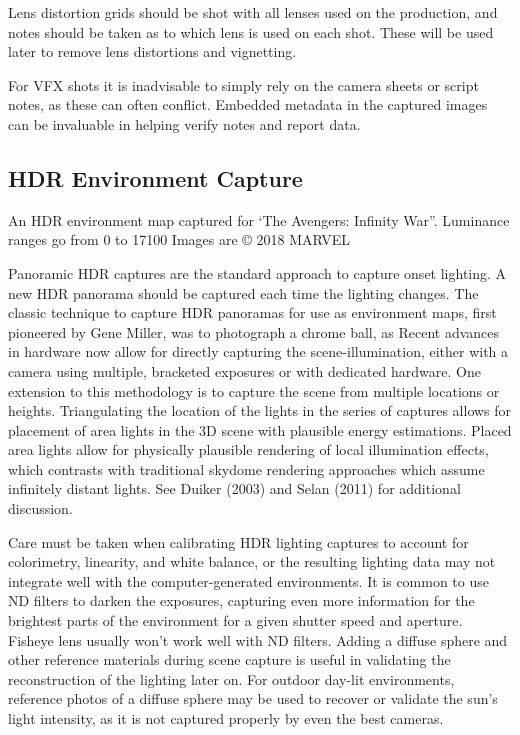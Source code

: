 Lens distortion grids should be shot with all lenses used on the production, and notes should be taken as to which lens is used on each shot. These will be used later to remove lens distortions and vignetting. 

For VFX shots it is inadvisable to simply rely on the camera sheets or script notes, as these can often conflict. Embedded metadata in the captured images can be invaluable in helping verify notes and report data.

\subsection{HDR Environment Capture}

An HDR environment map captured for ‘The Avengers: Infinity War”. Luminance ranges go from 0 to 17100 
Images are © 2018 MARVEL

Panoramic HDR captures are the standard approach to capture onset lighting. A new HDR panorama should be captured each time the lighting changes. The classic technique to capture HDR panoramas for use as environment maps, first pioneered by Gene Miller, was to photograph a chrome ball, as  Recent advances in hardware now allow for directly capturing the scene-illumination, either with a camera using multiple, bracketed exposures or with dedicated hardware. One extension to this methodology is to capture the scene from multiple locations or heights. Triangulating the location of the lights in the series of captures allows for placement of area lights in the 3D scene with plausible energy estimations. Placed area lights allow for physically plausible rendering of local illumination effects, which contrasts with traditional skydome rendering approaches which assume infinitely distant lights. See Duiker (2003) and Selan (2011) for additional discussion.

Care must be taken when calibrating HDR lighting captures to account for colorimetry, linearity, and white balance, or the resulting lighting data may not integrate well with the computer-generated environments. It is common to use ND filters to darken the exposures, capturing even more information for the brightest parts of the environment for a given shutter speed and aperture. Fisheye lens usually won’t work well with ND filters. Adding a diffuse sphere and other reference materials during scene capture is useful in validating the reconstruction of the lighting later on. For outdoor day-lit environments, reference photos of a diffuse sphere may be used to recover or validate the sun’s light intensity, as it is not captured properly by even the best cameras.

